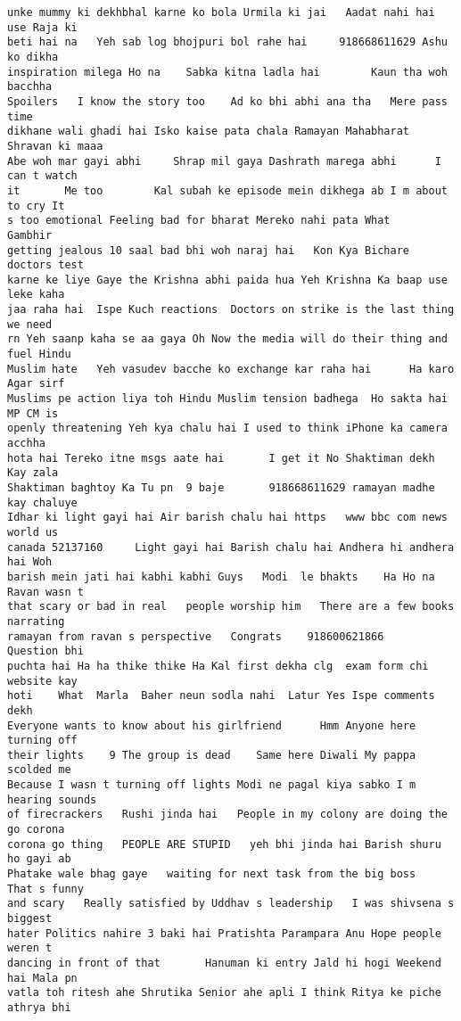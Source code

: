 \documentclass[11pt]{article}
\begin{document}
\begin{tcolorbox}[breakable, size=fbox, boxrule=.5pt, pad at break*=1mm, opacityfill=0]
\begin{Verbatim}[commandchars=\\\{\}]
unke mummy ki dekhbhal karne ko bola Urmila ki jai   Aadat nahi hai use Raja ki
beti hai na   Yeh sab log bhojpuri bol rahe hai     918668611629 Ashu ko dikha
inspiration milega Ho na    Sabka kitna ladla hai        Kaun tha woh bacchha
Spoilers   I know the story too    Ad ko bhi abhi ana tha   Mere pass time
dikhane wali ghadi hai Isko kaise pata chala Ramayan Mahabharat Shravan ki maaa
Abe woh mar gayi abhi     Shrap mil gaya Dashrath marega abhi      I can t watch
it       Me too        Kal subah ke episode mein dikhega ab I m about to cry It
s too emotional Feeling bad for bharat Mereko nahi pata What      Gambhir
getting jealous 10 saal bad bhi woh naraj hai   Kon Kya Bichare doctors test
karne ke liye Gaye the Krishna abhi paida hua Yeh Krishna Ka baap use leke kaha
jaa raha hai  Ispe Kuch reactions  Doctors on strike is the last thing we need
rn Yeh saanp kaha se aa gaya Oh Now the media will do their thing and fuel Hindu
Muslim hate   Yeh vasudev bacche ko exchange kar raha hai      Ha karo Agar sirf
Muslims pe action liya toh Hindu Muslim tension badhega  Ho sakta hai MP CM is
openly threatening Yeh kya chalu hai I used to think iPhone ka camera acchha
hota hai Tereko itne msgs aate hai       I get it No Shaktiman dekh Kay zala
Shaktiman baghtoy Ka Tu pn  9 baje       918668611629 ramayan madhe kay chaluye
Idhar ki light gayi hai Air barish chalu hai https   www bbc com news world us
canada 52137160     Light gayi hai Barish chalu hai Andhera hi andhera hai Woh
barish mein jati hai kabhi kabhi Guys   Modi  le bhakts    Ha Ho na Ravan wasn t
that scary or bad in real   people worship him   There are a few books narrating
ramayan from ravan s perspective   Congrats    918600621866      Question bhi
puchta hai Ha ha thike thike Ha Kal first dekha clg  exam form chi website kay
hoti    What  Marla  Baher neun sodla nahi  Latur Yes Ispe comments dekh
Everyone wants to know about his girlfriend      Hmm Anyone here turning off
their lights    9 The group is dead    Same here Diwali My pappa scolded me
Because I wasn t turning off lights Modi ne pagal kiya sabko I m hearing sounds
of firecrackers   Rushi jinda hai   People in my colony are doing the go corona
corona go thing   PEOPLE ARE STUPID   yeh bhi jinda hai Barish shuru ho gayi ab
Phatake wale bhag gaye   waiting for next task from the big boss   That s funny
and scary   Really satisfied by Uddhav s leadership   I was shivsena s biggest
hater Politics nahire 3 baki hai Pratishta Parampara Anu Hope people weren t
dancing in front of that       Hanuman ki entry Jald hi hogi Weekend hai Mala pn
vatla toh ritesh ahe Shrutika Senior ahe apli I think Ritya ke piche athrya bhi

\end{Verbatim}
\end{tcolorbox}
\end{document}
